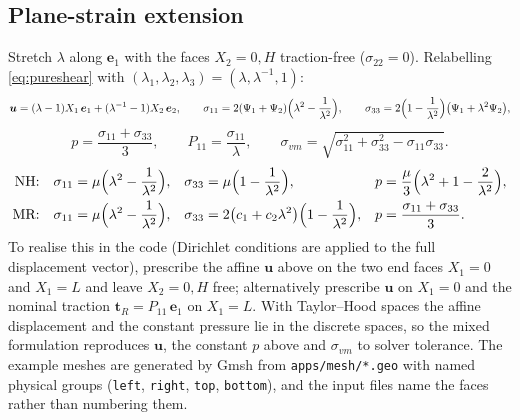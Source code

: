 \documentclass[11pt]{article}
\newcommand{\bu}{\bm{u}}
\newcommand{\be}{\bm{e}}
\newcommand{\bt}{\bm{t}}
\newcommand{\Pone}{\Psi_{1}}
\newcommand{\Ptwo}{\Psi_{2}}
\newcommand{\code}[1]{{\frenchspacing\texttt{#1}}}
\begin{document}
\subsection{Plane-strain extension}
Stretch $\lambda$ along $\be_1$ with the faces $X_2 = 0, H$ traction-free
($\sigma_{22} = 0$).  Relabelling \eqref{eq:pureshear} with
$(\lambda_1,\lambda_2,\lambda_3) = (\lambda, \lambda^{-1}, 1)$:
\begin{equation}
  \bu = (\lambda - 1)X_1\,\be_1 + (\lambda^{-1} - 1)X_2\,\be_2, \qquad
  \sigma_{11} = 2(\Pone + \Ptwo)\Bigl(\lambda^2 - \frac1{\lambda^2}\Bigr), \qquad
  \sigma_{33} = 2\Bigl(1 - \frac1{\lambda^2}\Bigr)\bigl(\Pone + \lambda^2\Ptwo\bigr),
\end{equation}
\begin{equation}
  p = \frac{\sigma_{11} + \sigma_{33}}{3}, \qquad
  P_{11} = \frac{\sigma_{11}}{\lambda}, \qquad
  \sigma_{vm} = \sqrt{\sigma_{11}^2 + \sigma_{33}^2 - \sigma_{11}\sigma_{33}} .
\end{equation}
\begin{align}
  \text{NH:}\quad & \sigma_{11} = \mu\Bigl(\lambda^2 - \frac1{\lambda^2}\Bigr), &
  \sigma_{33} &= \mu\Bigl(1 - \frac1{\lambda^2}\Bigr), &
  p &= \frac{\mu}{3}\Bigl(\lambda^2 + 1 - \frac{2}{\lambda^2}\Bigr), \\
  \text{MR:}\quad & \sigma_{11} = \mu\Bigl(\lambda^2 - \frac1{\lambda^2}\Bigr), &
  \sigma_{33} &= 2\bigl(c_1 + c_2\lambda^2\bigr)\Bigl(1 - \frac1{\lambda^2}\Bigr), &
  p &= \frac{\sigma_{11} + \sigma_{33}}{3}.
\end{align}
To realise this in the code (Dirichlet conditions are applied to the full
displacement vector), prescribe the affine $\bu$ above on the two end
faces $X_1 = 0$ and $X_1 = L$ and leave $X_2 = 0, H$ free; alternatively
prescribe $\bu$ on $X_1 = 0$ and the nominal traction
$\bt_R = P_{11}\,\be_1$ on $X_1 = L$.  With Taylor--Hood spaces the affine
displacement and the constant pressure lie in the discrete spaces, so the
mixed formulation reproduces $\bu$, the constant $p$ above and
$\sigma_{vm}$ to solver tolerance.  The example meshes are generated by Gmsh from \code{apps/mesh/*.geo} with
named physical groups (\code{left}, \code{right}, \code{top}, \code{bottom}),
and the input files name the faces rather than numbering them.
\end{document}
